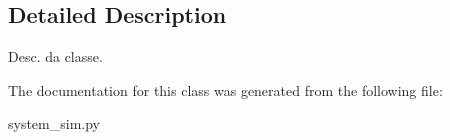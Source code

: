 \subsection{Detailed Description}
\begin{DoxyVerb}Desc. da classe.
\end{DoxyVerb}
 

The documentation for this class was generated from the following file\+:\begin{DoxyCompactItemize}
\item 
system\+\_\+sim.\+py\end{DoxyCompactItemize}
